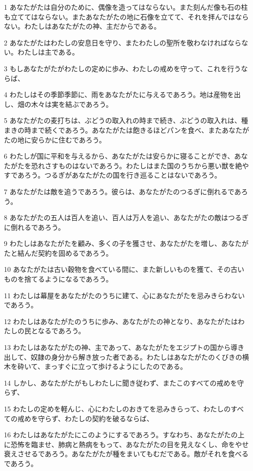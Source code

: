 \par 1 あなたがたは自分のために、偶像を造ってはならない。また刻んだ像も石の柱も立ててはならない。またあなたがたの地に石像を立てて、それを拝んではならない。わたしはあなたがたの神、主だからである。
\par 2 あなたがたはわたしの安息日を守り、またわたしの聖所を敬わなければならない。わたしは主である。
\par 3 もしあなたがたがわたしの定めに歩み、わたしの戒めを守って、これを行うならば、
\par 4 わたしはその季節季節に、雨をあなたがたに与えるであろう。地は産物を出し、畑の木々は実を結ぶであろう。
\par 5 あなたがたの麦打ちは、ぶどうの取入れの時まで続き、ぶどうの取入れは、種まきの時まで続くであろう。あなたがたは飽きるほどパンを食べ、またあなたがたの地に安らかに住むであろう。
\par 6 わたしが国に平和を与えるから、あなたがたは安らかに寝ることができ、あなたがたを恐れさすものはないであろう。わたしはまた国のうちから悪い獣を絶やすであろう。つるぎがあなたがたの国を行き巡ることはないであろう。
\par 7 あなたがたは敵を追うであろう。彼らは、あなたがたのつるぎに倒れるであろう。
\par 8 あなたがたの五人は百人を追い、百人は万人を追い、あなたがたの敵はつるぎに倒れるであろう。
\par 9 わたしはあなたがたを顧み、多くの子を獲させ、あなたがたを増し、あなたがたと結んだ契約を固めるであろう。
\par 10 あなたがたは古い穀物を食べている間に、また新しいものを獲て、その古いものを捨てるようになるであろう。
\par 11 わたしは幕屋をあなたがたのうちに建て、心にあなたがたを忌みきらわないであろう。
\par 12 わたしはあなたがたのうちに歩み、あなたがたの神となり、あなたがたはわたしの民となるであろう。
\par 13 わたしはあなたがたの神、主であって、あなたがたをエジプトの国から導き出して、奴隷の身分から解き放った者である。わたしはあなたがたのくびきの横木を砕いて、まっすぐに立って歩けるようにしたのである。
\par 14 しかし、あなたがたがもしわたしに聞き従わず、またこのすべての戒めを守らず、
\par 15 わたしの定めを軽んじ、心にわたしのおきてを忌みきらって、わたしのすべての戒めを守らず、わたしの契約を破るならば、
\par 16 わたしはあなたがたにこのようにするであろう。すなわち、あなたがたの上に恐怖を臨ませ、肺病と熱病をもって、あなたがたの目を見えなくし、命をやせ衰えさせるであろう。あなたがたが種をまいてもむだである。敵がそれを食べるであろう。
